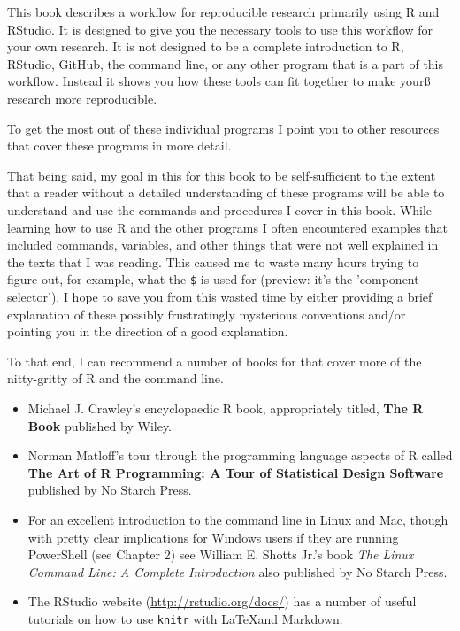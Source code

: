 \documentclass[ChapterTOCs,krantz1]{krantz}\usepackage{graphicx, color}
\begin{document}
This book describes a workflow for reproducible research primarily using
R and RStudio. It is designed to give you the
necessary tools to use this workflow for your own research. It is not
designed to be a complete introduction to R, RStudio,
GitHub, the command line, or any other program that is a part
of this workflow. Instead it shows you how these tools can fit together
to make yourß research more reproducible.

To get the most out of these individual programs I point you to other
resources that cover these programs in more detail.

That being said, my goal in this for this book to be self-sufficient to
the extent that a reader without a detailed understanding of these
programs will be able to understand and use the commands and procedures
I cover in this book. While learning how to use R and the other
programs I often encountered examples that included commands, variables,
and other things that were not well explained in the texts that I was
reading. This caused me to waste many hours trying to figure out, for
example, what the \texttt{\$} is used for (preview: it's the 'component selector'). I hope to save
you from this wasted time by either providing a brief explanation of
these possibly frustratingly mysterious conventions and/or pointing you
in the direction of a good explanation.

To that end, I can recommend a number of books for that cover more of
the nitty-gritty of R and the command line.

\begin{itemize}
\item
  Michael J. Crawley's encyclopaedic R book, appropriately
  titled, \textbf{The R Book} published by Wiley.
\item
  Norman Matloff's tour through the programming language aspects of
  R called \textbf{The Art of R Programming: A Tour of
  Statistical Design Software} published by No Starch Press.
\item
  For an excellent introduction to the command line in Linux and Mac,
  though with pretty clear implications for Windows users if they are
  running PowerShell (see Chapter 2) see William E. Shotts
  Jr.'s book \emph{The Linux Command Line: A Complete Introduction} also
  published by No Starch Press.
\item
  The RStudio website (\url{http://rstudio.org/docs/}) has a
  number of useful tutorials on how to use \texttt{knitr} with
  \LaTeX and Markdown.
\end{itemize}
\end{document}
